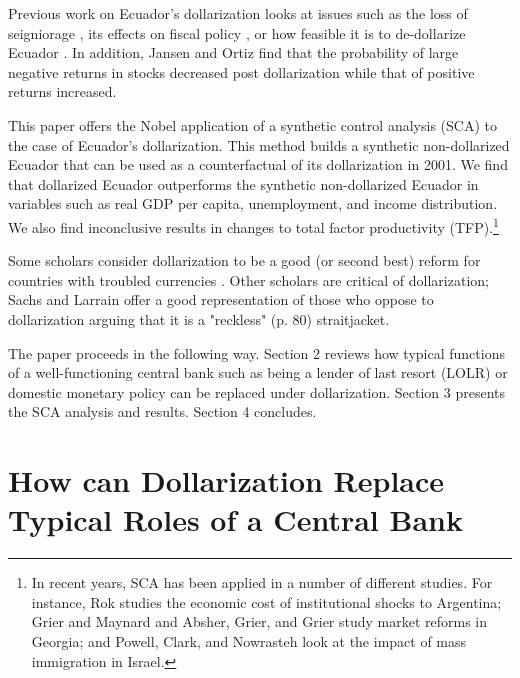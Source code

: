 \documentclass[12pt]{article}
\begin{document}
Previous work on Ecuador's dollarization looks at issues such as the loss of seigniorage \parencite{Lange2005}, its effects on fiscal policy \parencite{MariDelCristo2016}, or how feasible it is to de-dollarize Ecuador \parencite{JAMESON2003}. In addition, Jansen and Ortiz \parencite*{Jansen2007} find that the probability of large negative returns in stocks decreased post dollarization while that of positive returns increased.

This paper offers the Nobel application of a synthetic control analysis (SCA) \parencite{Abadie,Abadie2003,Abadie2015} to the case of Ecuador's dollarization. This method builds a synthetic non-dollarized Ecuador that can be used as a counterfactual of its dollarization in 2001. We find that dollarized Ecuador outperforms the synthetic non-dollarized Ecuador in variables such as real GDP per capita, unemployment, and income distribution. We also find inconclusive results in changes to total factor productivity (TFP).\footnote{In recent years, SCA has been applied in a number of different studies. For instance, Rok \parencite*{Spruk2019} studies the economic cost of institutional shocks to Argentina; Grier and Maynard \parencite*{Grier2016} and Absher, Grier, and Grier \parencite*{Absher2020} study market reforms in Georgia; and Powell, Clark, and Nowrasteh \parencite*{Powell2017} look at the impact of mass immigration in Israel.}

Some scholars consider dollarization to be a good (or second best) reform for countries with troubled currencies \parencite{Avila2019,Cochrane2018,Gale2002,Hanke2003a,White2014a}. Other scholars are critical of dollarization; Sachs and Larrain \parencite*{Sachs1999} offer a good representation of those who oppose to dollarization arguing that it is a "reckless" (p. 80) straitjacket. 

The paper proceeds in the following way. Section 2 reviews how typical functions of a well-functioning central bank such as being a lender of last resort (LOLR) or domestic monetary policy can be replaced under dollarization. Section 3 presents the SCA analysis and results. Section 4 concludes.


\section{How can Dollarization Replace Typical Roles of a Central Bank}
    \label{sec:debate}
\end{document}
